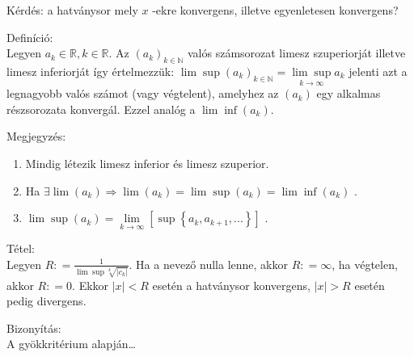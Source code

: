 \documentclass[12pt,a4paper]{scrartcl}
\providecommand{\tightlist}{%
  \setlength{\itemsep}{0pt}\setlength{\parskip}{0pt}}
\newenvironment{definicio}{}{}
\newenvironment{tetel}{}{}
\newenvironment{bizonyitas}{}{}
\newenvironment{megjegyzes}{}{}
\begin{document}
Kérdés: a hatványsor mely \(x\) -ekre konvergens, illetve egyenletesen
konvergens?

\begin{definicio}

Definíció:\\
Legyen \(a_{k} \in {\mathbb{R}},k \in {\mathbb{R}}\). Az
\(\left( a_{k} \right)_{k \in {\mathbb{N}}}\) valós számsorozat limesz
szuperiorját illetve limesz inferiorját így értelmezzük:
\(\lim\sup\left( a_{k} \right)_{k \in {\mathbb{N}}} = \underset{k\rightarrow\infty}{\lim\sup}a_{k}\)
jelenti azt a legnagyobb valós számot (vagy végtelent), amelyhez az
\(\left( a_{k} \right)\) egy alkalmas részsorozata konvergál. Ezzel
analóg a \(\lim\inf\left( a_{k} \right)\).

\end{definicio}

\begin{megjegyzes}

Megjegyzés:

\begin{enumerate}
\def\labelenumi{\arabic{enumi}.}
\tightlist
\item
  Mindig létezik limesz inferior és limesz szuperior.
\item
  Ha
  \(\left. \exists\lim\left( a_{k} \right)\Rightarrow\lim\left( a_{k} \right) = \lim\sup\left( a_{k} \right) = \lim\inf\left( a_{k} \right) \right.\)
  .
\item
  \(\lim\sup\left( a_{k} \right) = \underset{k\rightarrow\infty}{\lim}\left\lbrack {\sup\left\{ {a_{k},a_{k + 1},...} \right\}} \right\rbrack\)
  .
\end{enumerate}

\end{megjegyzes}

\begin{tetel}

Tétel:\\
Legyen \(R: = \frac{1}{\lim\sup\sqrt[k]{\left| c_{k} \right|}}\). Ha a
nevező nulla lenne, akkor \(R: = \infty\), ha végtelen, akkor
\(R: = 0\). Ekkor \(\left| x \right| < R\) esetén a hatványsor
konvergens, \(\left| x \right| > R\) esetén pedig divergens.

\end{tetel}

\begin{bizonyitas}

Bizonyítás:\\
A gyökkritérium alapján\ldots{}

\end{bizonyitas}
\end{document}
